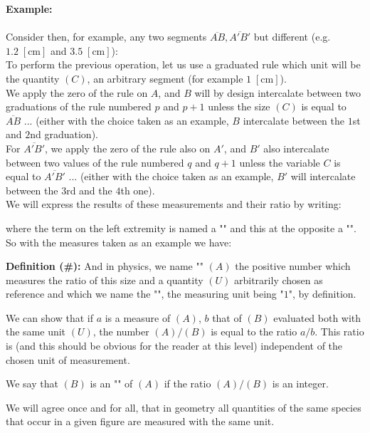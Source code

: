 	\begin{tcolorbox}[colframe=black,colback=white,sharp corners]
	\textbf{{\Large {}}Example:}\\\\
	Consider then, for example, any two segments $\overline{AB}, \overline{A'B'}$ but different (e.g. $1.2\;[\text{cm}]$ and $3.5\;[\text{cm}]$):\\
	
	To perform the previous operation, let us use a graduated rule which unit will be the quantity $(C)$, an arbitrary segment (for example $1 \;[\text{cm}]$).\\
	
	We apply the zero of the rule on $A$, and $B$ will by design intercalate between two graduations of the rule numbered $p$ and $p + 1$ unless the size $(C)$ is equal to $\overline{AB}$ ... (either with the choice taken as an example, $B$ intercalate between the $1$st and $2$nd graduation).\\
	
	For $\overline{A'B'}$, we apply the zero of the rule also on $A'$, and $B'$ also intercalate between two values of the rule numbered $q$ and $q + 1$ unless the variable $C$ is equal to $\overline{A'B'}$ ... (either with the choice taken as an example, $B'$ will intercalate between the $3$rd and the $4$th one).\\
	
	We will express the results of these measurements and their ratio by writing:
	
	where the term on the left extremity is named a "" and this at the opposite a "".\\
	
	So with the measures taken as an example we have:
	
	\end{tcolorbox}
	\textbf{Definition (\#\mydef):} And in physics, we name "" $(A)$ the positive number which measures the ratio of this size and a quantity $(U)$ arbitrarily chosen as reference and which we name the "", the measuring unit being "$1$", by definition.
	
	We can show that if $a$ is a measure of $(A)$, $b$ that of $(B)$ evaluated both with the same unit $(U)$, the number $(A) / (B)$ is equal to the ratio $a / b$. This ratio is (and this should be obvious for the reader at this level) independent of the chosen unit of measurement.
	\begin{tcolorbox}[title=Remark,colframe=black,arc=10pt]
	We say that $(B)$ is an "" of $(A)$ if the ratio $(A)/(B)$ is an integer.
	\end{tcolorbox}
	We will agree once and for all, that in geometry all quantities of the same species that occur in a given figure are measured with the same unit.
	
